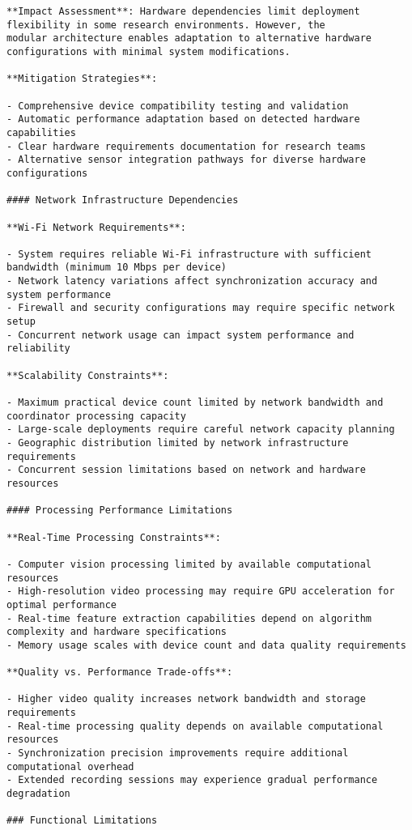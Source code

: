 \documentclass[12pt,a4paper]{report}
\begin{document}
\begin{verbatim}
**Impact Assessment**: Hardware dependencies limit deployment flexibility in some research environments. However, the
modular architecture enables adaptation to alternative hardware configurations with minimal system modifications.

**Mitigation Strategies**:

- Comprehensive device compatibility testing and validation
- Automatic performance adaptation based on detected hardware capabilities
- Clear hardware requirements documentation for research teams
- Alternative sensor integration pathways for diverse hardware configurations

#### Network Infrastructure Dependencies

**Wi-Fi Network Requirements**:

- System requires reliable Wi-Fi infrastructure with sufficient bandwidth (minimum 10 Mbps per device)
- Network latency variations affect synchronization accuracy and system performance
- Firewall and security configurations may require specific network setup
- Concurrent network usage can impact system performance and reliability

**Scalability Constraints**:

- Maximum practical device count limited by network bandwidth and coordinator processing capacity
- Large-scale deployments require careful network capacity planning
- Geographic distribution limited by network infrastructure requirements
- Concurrent session limitations based on network and hardware resources

#### Processing Performance Limitations

**Real-Time Processing Constraints**:

- Computer vision processing limited by available computational resources
- High-resolution video processing may require GPU acceleration for optimal performance
- Real-time feature extraction capabilities depend on algorithm complexity and hardware specifications
- Memory usage scales with device count and data quality requirements

**Quality vs. Performance Trade-offs**:

- Higher video quality increases network bandwidth and storage requirements
- Real-time processing quality depends on available computational resources
- Synchronization precision improvements require additional computational overhead
- Extended recording sessions may experience gradual performance degradation

### Functional Limitations


\end{verbatim}
\end{document}

